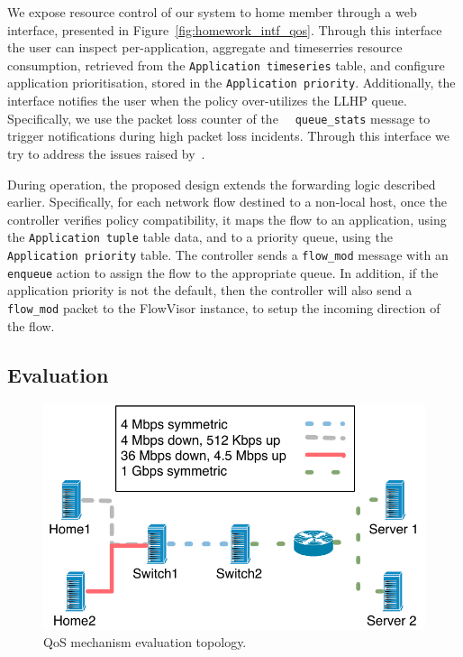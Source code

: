 We expose resource control of our system to home member through a web interface,
presented in Figure~\ref{fig:homework_intf_qos}.  Through this interface the
user can inspect per-application, aggregate and timeserries resource consumption,
retrieved from the \texttt{Application timeseries} table, and configure
application prioritisation, stored in the \texttt{Application priority}.
Additionally, the interface notifies the user when the policy over-utilizes the
LLHP queue.  Specifically, we use the packet loss counter of the \of~{\tt
  queue\_stats} message to trigger notifications during high packet loss
incidents.  Through this interface we try to address the issues raised
by~. 

During operation, the proposed design extends the forwarding logic described
earlier. Specifically, for each network flow destined to a non-local host, once
the controller verifies policy compatibility, it maps the flow to an
application, using the \texttt{Application tuple} table data,  and to a priority
queue, using the \texttt{Application priority} table. The controller sends a
{\tt flow\_mod} message with an {\tt enqueue} action to assign the flow to the
appropriate queue. In addition, if the application priority is not the default,
then the controller will also send a {\tt flow\_mod} packet to the FlowVisor
instance, to setup the incoming direction of the flow. 


\subsection{Evaluation} \label{s:qos:eval}

\begin{figure}
  \centering
  \includegraphics[width=0.6\columnwidth]{queue_eval_setup}
  \caption{\label{fig:queue_eval_setup} QoS mechanism evaluation topology.}
\end{figure}

